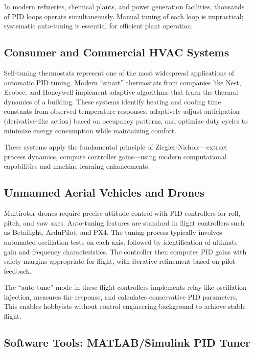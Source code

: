 In modern refineries, chemical plants, and power generation facilities, thousands of PID loops operate simultaneously. Manual tuning of each loop is impractical; systematic auto-tuning is essential for efficient plant operation.

\subsection{Consumer and Commercial HVAC Systems}

Self-tuning thermostats represent one of the most widespread applications of automatic PID tuning. Modern ``smart'' thermostats from companies like Nest, Ecobee, and Honeywell implement adaptive algorithms that learn the thermal dynamics of a building. These systems identify heating and cooling time constants from observed temperature responses, adaptively adjust anticipation (derivative-like action) based on occupancy patterns, and optimize duty cycles to minimize energy consumption while maintaining comfort.

These systems apply the fundamental principle of Ziegler-Nichols---extract process dynamics, compute controller gains---using modern computational capabilities and machine learning enhancements.

\subsection{Unmanned Aerial Vehicles and Drones}

Multirotor drones require precise attitude control with PID controllers for roll, pitch, and yaw axes. Auto-tuning features are standard in flight controllers such as Betaflight, ArduPilot, and PX4. The tuning process typically involves automated oscillation tests on each axis, followed by identification of ultimate gain and frequency characteristics. The controller then computes PID gains with safety margins appropriate for flight, with iterative refinement based on pilot feedback.

The ``auto-tune'' mode in these flight controllers implements relay-like oscillation injection, measures the response, and calculates conservative PID parameters. This enables hobbyists without control engineering background to achieve stable flight.

\subsection{Software Tools: MATLAB/Simulink PID Tuner}

